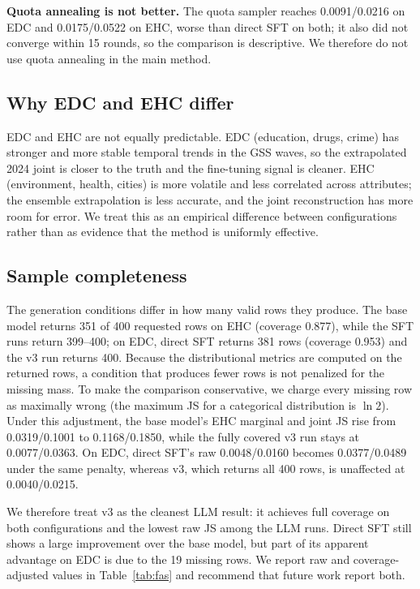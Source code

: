 \textbf{Quota annealing is not better.} The quota sampler reaches
0.0091/0.0216 on EDC and 0.0175/0.0522 on EHC, worse than direct SFT on
both; it also did not converge within 15 rounds, so the comparison is
descriptive. We therefore do not use quota annealing in the main method.

\subsection{Why EDC and EHC differ}\label{why-edc-and-ehc-differ}

EDC and EHC are not equally predictable. EDC (education, drugs, crime)
has stronger and more stable temporal trends in the GSS waves, so the
extrapolated 2024 joint is closer to the truth and the fine-tuning
signal is cleaner. EHC (environment, health, cities) is more volatile
and less correlated across attributes; the ensemble extrapolation is
less accurate, and the joint reconstruction has more room for error. We
treat this as an empirical difference between configurations rather than
as evidence that the method is uniformly effective.

\subsection{Sample completeness}\label{sample-completeness}

The generation conditions differ in how many valid rows they produce.
The base model returns 351 of 400 requested rows on EHC (coverage
0.877), while the SFT runs return 399--400; on EDC, direct SFT returns
381 rows (coverage 0.953) and the v3 run returns 400. Because the
distributional metrics are computed on the returned rows, a condition
that produces fewer rows is not penalized for the missing mass. To make
the comparison conservative, we charge every missing row as maximally
wrong (the maximum JS for a categorical distribution is \(\ln 2\)).
Under this adjustment, the base model's EHC marginal and joint JS rise
from 0.0319/0.1001 to 0.1168/0.1850, while the fully covered v3 run
stays at 0.0077/0.0363. On EDC, direct SFT's raw 0.0048/0.0160 becomes
0.0377/0.0489 under the same penalty, whereas v3, which returns all 400
rows, is unaffected at 0.0040/0.0215.

We therefore treat v3 as the cleanest LLM result: it achieves full
coverage on both configurations and the lowest raw JS among the LLM
runs. Direct SFT still shows a large improvement over the base model,
but part of its apparent advantage on EDC is due to the 19 missing rows.
We report raw and coverage-adjusted values in Table~\ref{tab:fas} and recommend that
future work report both.

